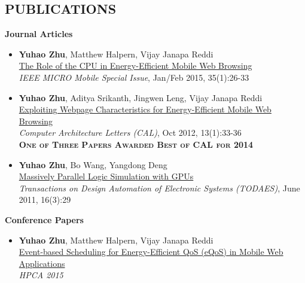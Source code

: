 \documentclass[margin, 9pt]{res} %
\begin{document}
\begin{resume}
 
\section{PUBLICATIONS}

{\large\textbf{Journal Articles}}

\begin{itemize}[leftmargin=*] \itemsep 0pt
	\item \textbf{Yuhao Zhu}, Matthew Halpern, Vijay Janapa Reddi\\
          \href{http://yuhaozhu.com/pubs/ieeemicro15.pdf}{The Role of the CPU in Energy-Efficient Mobile Web Browsing}\\
          \textit{IEEE MICRO Mobile Special Issue}, Jan/Feb 2015, 35(1):26-33

	\item \textbf{Yuhao Zhu}, Aditya Srikanth, Jingwen Leng, Vijay Janapa Reddi\\
          \href{http://yuhaozhu.com/pubs/cal12.pdf}{Exploiting Webpage Characteristics for Energy-Efficient Mobile Web Browsing}\\
          \textit{Computer Architecture Letters (CAL)}, Oct 2012, 13(1):33-36\\
          \textbf{\textsc{One of Three Papers Awarded Best of CAL for 2014}}

	\item \textbf{Yuhao Zhu}, Bo Wang, Yangdong Deng\\
          \href{http://yuhaozhu.com/pubs/todaes11.pdf}{Massively Parallel Logic Simulation with GPUs}\\
          \textit{Transactions on Design Automation of Electronic Systems (TODAES)}, June 2011, 16(3):29
\end{itemize}

\vspace*{7pt}
{\large\textbf{Conference Papers}}

\begin{itemize}[leftmargin=*] \itemsep 0pt
	\item \textbf{Yuhao Zhu}, Matthew Halpern, Vijay Janapa Reddi\\
          \href{http://yuhaozhu.com/pubs/hpca15.pdf}{Event-based Scheduling for Energy-Efficient QoS (eQoS) in Mobile Web Applications}\\
          \textit{HPCA 2015}


\end{itemize}
\end{resume}
\end{document}
